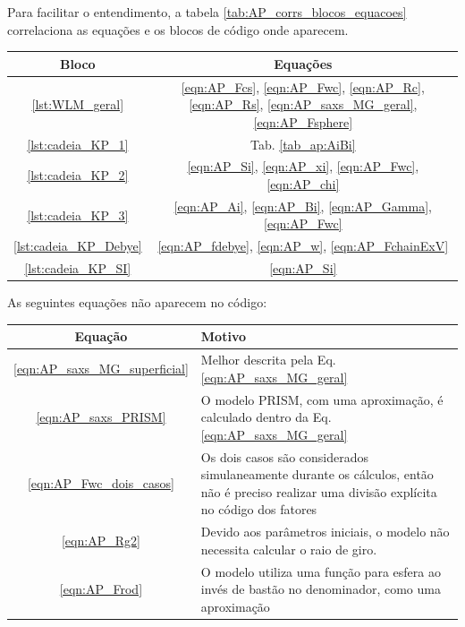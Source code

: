 \begin{apendicesenv}
Para facilitar o entendimento, a tabela \ref{tab:AP_corrs_blocos_equacoes} correlaciona as equações e os blocos de código onde aparecem.

\begin{table}[H]
	{%
		\begin{tabular}{c c}
			\toprule
			Bloco           & Equações                                                                                                       \\ \midrule
			\ref{lst:WLM_geral}    & \ref{eqn:AP_Fcs}, \ref{eqn:AP_Fwc}, \ref{eqn:AP_Rc}, \ref{eqn:AP_Rs}, \ref{eqn:AP_saxs_MG_geral}, \ref{eqn:AP_Fsphere}  \\
			\ref{lst:cadeia_KP_1}   & Tab. \ref{tab_ap:AiBi}                                                                                                  \\
			\ref{lst:cadeia_KP_2}   & \ref{eqn:AP_Si}, \ref{eqn:AP_xi}, \ref{eqn:AP_Fwc}, \ref{eqn:AP_chi}                                                  \\
			\ref{lst:cadeia_KP_3}   & \ref{eqn:AP_Ai}, \ref{eqn:AP_Bi}, \ref{eqn:AP_Gamma}, \ref{eqn:AP_Fwc}                                                \\
			\ref{lst:cadeia_KP_Debye} & \ref{eqn:AP_fdebye}, \ref{eqn:AP_w}, \ref{eqn:AP_FchainExV}                                                          \\
			\ref{lst:cadeia_KP_SI}   & \ref{eqn:AP_Si}                                                                                                    \\ \bottomrule
		\end{tabular}%
	}{}
\end{table}

As seguintes equações não aparecem no código:

\begin{table}[H]
	{%
		\begin{tabular}{c p{10cm}}
			\toprule
			Equação   & Motivo  \\ \midrule
			\ref{eqn:AP_saxs_MG_superficial} & Melhor descrita pela Eq. \ref{eqn:AP_saxs_MG_geral} \\
			\ref{eqn:AP_saxs_PRISM} & O modelo PRISM, com uma aproximação, é calculado dentro da Eq. \ref{eqn:AP_saxs_MG_geral}  \\
			\ref{eqn:AP_Fwc_dois_casos} & Os dois casos são considerados simulaneamente durante os cálculos, então não é preciso realizar uma divisão explícita no código dos fatores \\
			\ref{eqn:AP_Rg2} & Devido aos parâmetros iniciais, o modelo não necessita calcular o raio de giro. \\
			\ref{eqn:AP_Frod}  & O modelo utiliza uma função para esfera ao invés de bastão no denominador, como uma aproximação \\ \bottomrule
		\end{tabular}%
	}{}
\end{table}


\end{apendicesenv}
